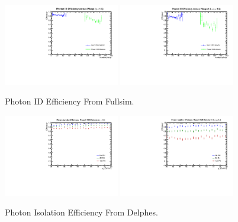 \documentclass{cmspaper}
\begin{document}
\begin{figure}[h]
  \centering
  \includegraphics[width=0.45\textwidth]{figures/PhotonIDnoheEfficiencyTrend_fullsim_Eta1.pdf}
  \includegraphics[width=0.45\textwidth]{figures/PhotonIDnoheEfficiencyTrend_fullsim_Eta2.pdf} 
  \caption{Photon ID Efficiency From Fullsim.}
  \label{fig:PhotonIDEfficiencyVsPU}
\end{figure}

\begin{figure}[h]
  \centering
  \includegraphics[width=0.45\textwidth]{figures/PhotonIsoEfficiencyTrend_phaseII_Eta1.pdf}
  \includegraphics[width=0.45\textwidth]{figures/PhotonIsoEfficiencyTrend_phaseII_Eta2.pdf}
  \caption{Photon Isolation Efficiency From Delphes.}
  \label{fig:PhotonIsoEfficiencyVsPU}
\end{figure}
\end{document}
